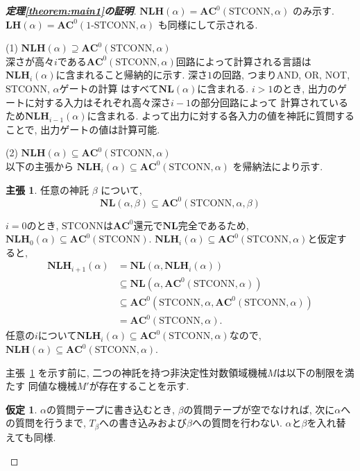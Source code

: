 \documentclass[11pt,a4paper]{jsarticle}
\theoremstyle{definition}
\newtheorem{claim}[theorem]{主張}
\newtheorem*{assumption}{仮定}
\theoremstyle{remark}
\newcommand{\classfont}{\mathbf}
\newcommand{\AC}{\classfont{AC}}
\newcommand{\NL}{\classfont{NL}}
\newcommand{\LH}{\classfont{LH}}
\newcommand{\NLH}{\classfont{NLH}}
\newcommand{\probfont}{\text}
\newcommand{\oneSTCONN}{\probfont{1-STCONN}}
\newcommand{\STCONN}{\probfont{STCONN}}
\begin{document}
\begin{proof}[\bf 定理\ref{theorem:main1}の証明]
 $\NLH(\alpha) = \AC^0(\STCONN, \alpha)$ のみ示す.
 $\LH(\alpha) = \AC^0(\oneSTCONN, \alpha)$ も同様にして示される.


 (1) $\NLH(\alpha) \supseteq \AC^0(\STCONN, \alpha)$\\
 深さが高々$i$である$\AC^0(\STCONN, \alpha)$回路によって計算される言語は
 $\NLH_i(\alpha)$に含まれること帰納的に示す.
 深さ$1$の回路, つまりAND, OR, NOT, $\STCONN$, $\alpha$ゲートの計算
 はすべて$\NL(\alpha)$に含まれる.
 $i > 1$のとき,
 出力のゲートに対する入力はそれぞれ高々深さ$i-1$の部分回路によって
 計算されているため$\NLH_{i-1}(\alpha)$に含まれる.
 よって出力に対する各入力の値を神託に質問することで,
 出力ゲートの値は計算可能.

 (2) $\NLH(\alpha) \subseteq \AC^0(\STCONN, \alpha)$\\
 以下の主張から $\NLH_i(\alpha) \subseteq \AC^0(\STCONN, \alpha)$
 を帰納法により示す.
\begin{claim}
 \label{claim: NLsubseteqAC0STCONN}
 任意の神託 $\beta$ について,
 \begin{equation*}
  \NL(\alpha, \beta) \subseteq \AC^0(\STCONN, \alpha, \beta)
 \end{equation*}
\end{claim}
 $i=0$のとき,
 $\STCONN$は$\AC^0$還元で$\NL$完全であるため,
 $\NLH_0(\alpha) \subseteq \AC^0(\STCONN)$.
 $\NLH_i(\alpha) \subseteq \AC^0(\STCONN, \alpha)$と仮定すると,
 \begin{align*}
  \NLH_{i+1}(\alpha) 
  & = 
  \NL(\alpha, \NLH_i(\alpha)) \\
  & \subseteq
  \NL(\alpha, \AC^0(\STCONN, \alpha)) \\
  & \subseteq
  \AC^0(\STCONN, \alpha, \AC^0(\STCONN, \alpha)) \\
  & =
  \AC^0(\STCONN, \alpha).
 \end{align*}
任意の$i$について$\NLH_i(\alpha) \subseteq \AC^0(\STCONN, \alpha)$なので, $\NLH(\alpha) \subseteq \AC^0(\STCONN, \alpha)$.


主張~\ref{claim: NLsubseteqAC0STCONN} を示す前に,
二つの神託を持つ非決定性対数領域機械$M$は以下の制限を満たす
同値な機械$M'$が存在することを示す.
\begin{assumption}
$\alpha$の質問テープに書き込むとき, $\beta$の質問テープが空でなければ,
次に$\alpha$への質問を行うまで,
$T_\beta$への書き込みおよび$\beta$への質問を行わない.
$\alpha$と$\beta$を入れ替えても同様.
\end{assumption}


\end{proof}
\end{document}

